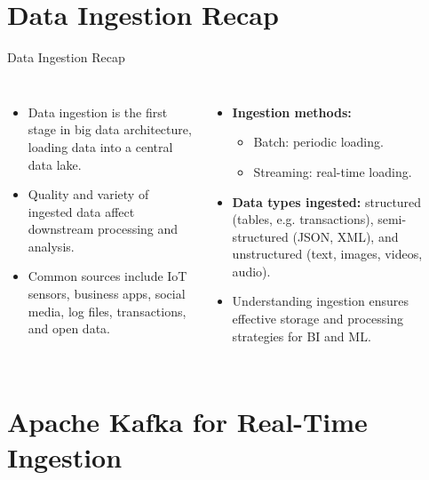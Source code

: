\documentclass[aspectratio=169, table]{beamer}
\begin{document}
\section{Data Ingestion Recap}

\begin{frame}{Data Ingestion Recap}
	\vspace{10pt}
	
	\begin{columns}[T]
		
		\begin{itemize}
			\item Data ingestion is the first stage in big data architecture, loading data into a central data lake.
			
			\item Quality and variety of ingested data affect downstream processing and analysis.
			
			\item Common sources include IoT sensors, business apps, social media, log files, transactions, and open data.
		\end{itemize}
		
		\begin{itemize}
			\item \textbf{Ingestion methods:}
			\begin{itemize}
				\item Batch: periodic loading.
				\item Streaming: real-time loading.
			\end{itemize}
			
			\item \textbf{Data types ingested:} structured (tables, e.g. transactions), semi-structured (JSON, XML), and unstructured (text, images, videos, audio).
			
			\item Understanding ingestion ensures effective storage and processing strategies for BI and ML.
		\end{itemize}
		
	\end{columns}
	
\end{frame}

\section{Apache Kafka for Real-Time Ingestion}
\end{document}
